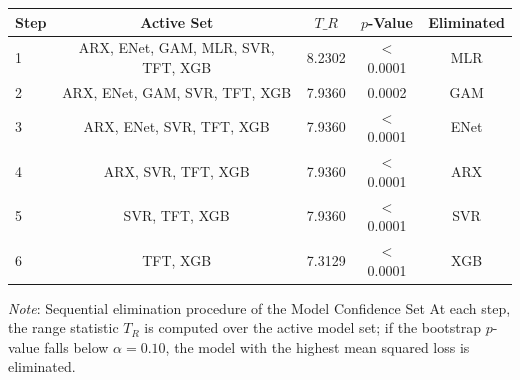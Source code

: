 \begin{tabular}{lcccc}
  \toprule
  \textbf{Step} & \textbf{Active Set} & \textbf{$T\_R$} & \textbf{$p$-Value} & \textbf{Eliminated} \\ 
  \midrule
  1 & ARX, ENet, GAM, MLR, SVR, TFT, XGB & 8.2302 & $<$0.0001 & MLR \\ 
  2 & ARX, ENet, GAM, SVR, TFT, XGB & 7.9360 & 0.0002 & GAM \\ 
  3 & ARX, ENet, SVR, TFT, XGB & 7.9360 & $<$0.0001 & ENet \\ 
  4 & ARX, SVR, TFT, XGB & 7.9360 & $<$0.0001 & ARX \\ 
  5 & SVR, TFT, XGB & 7.9360 & $<$0.0001 & SVR \\ 
  6 & TFT, XGB & 7.3129 & $<$0.0001 & XGB \\ 
  \bottomrule
\end{tabular}
\par\vspace{4pt}
\begin{minipage}{\linewidth}
  \footnotesize \textit{Note}: Sequential elimination procedure of the Model Confidence Set At each step, the range statistic $T_R$ is computed over the active model set; if the bootstrap $p$-value falls below $\alpha = 0.10$, the model with the highest mean squared loss is eliminated.
\end{minipage}